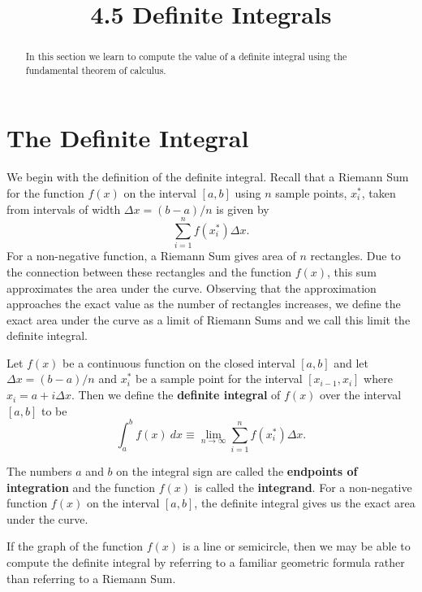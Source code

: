 \documentclass[handout]{ximera}
\title{4.5 Definite Integrals}
\begin{document}
\begin{abstract}
In this section we learn to compute the value of a definite integral using the fundamental theorem of calculus.
\end{abstract}

\maketitle



\section{The Definite Integral}

We begin with the definition of the definite integral.
Recall that a Riemann Sum for the function $f(x)$ on the interval $[a,b]$ using $n$ sample points, $x_i^*$, taken from intervals of width $\Delta x = (b-a)/n$ is given by
\[\sum_{i = 1}^n f(x_i^*)\Delta x.\]
For a non-negative function, a Riemann Sum gives area of $n$ rectangles. Due to the connection between these rectangles and the function $f(x)$,
this sum approximates the area under the curve.  Observing that the approximation approaches the exact value as the number of rectangles increases,
we define the exact area under the curve as a limit of Riemann Sums and we call this limit the definite integral.

\begin{definition}
Let $f(x)$ be a continuous function on the closed interval $[a,b]$ and let 
$\Delta x = (b-a)/n$ and $x_i^*$ be a sample point for the interval $[x_{i-1}, x_i]$ where $x_i = a+i\Delta x$. Then we define the \textbf{definite integral} of $f(x)$ over the interval $[a,b]$ to be
\[\int_a^b f(x) \ dx \equiv \lim_{n\to \infty} \sum_{i=1}^n f(x_i^*)\Delta x.\]
\end{definition} 
The numbers $a$ and $b$ on the integral sign
are called the \textbf{endpoints of integration} and the function $f(x)$ is called the \textbf{integrand}.  
For a non-negative function $f(x)$ on the interval $[a,b]$, the definite integral gives us the exact area under the curve.

If the graph of the function $f(x)$ is a line or semicircle, then we may be able to compute the definite integral 
by referring to a familiar geometric formula rather than referring to a Riemann Sum.

\end{document}
